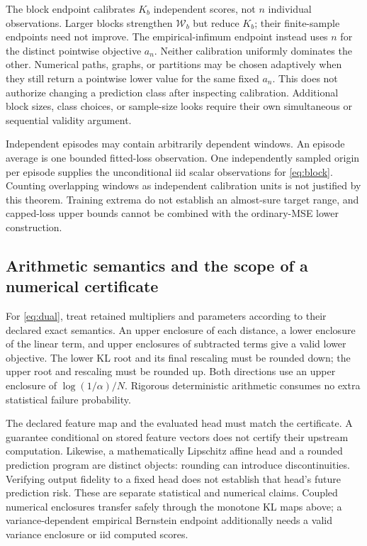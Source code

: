 The block endpoint calibrates $K_b$ independent scores, not $n$ individual
observations. Larger blocks strengthen $\mathcal W_b$ but reduce $K_b$;
their finite-sample endpoints need not improve. The empirical-infimum
endpoint instead uses $n$ for the distinct pointwise objective $a_n$.
Neither calibration uniformly dominates the other. Numerical paths,
graphs, or partitions may be chosen adaptively when they still return a
pointwise lower value for the same fixed $a_n$. This does not authorize
changing a prediction class after inspecting calibration. Additional block
sizes, class choices, or sample-size looks require their own simultaneous
or sequential validity argument.

Independent episodes may contain arbitrarily dependent windows. An episode
average is one bounded fitted-loss observation. One independently sampled
origin per episode supplies the unconditional iid scalar observations for
\eqref{eq:block}. Counting overlapping windows as independent calibration
units is not justified by this theorem. Training extrema do not establish
an almost-sure target range, and capped-loss upper bounds cannot be combined
with the ordinary-MSE lower construction.

\subsection{Arithmetic semantics and the scope of a numerical certificate}

For \eqref{eq:dual}, treat retained multipliers and parameters according
to their declared exact semantics. An upper enclosure of each distance,
a lower enclosure of the linear term, and upper enclosures of subtracted
terms give a valid lower objective. The lower KL root and its final
rescaling must be rounded down; the upper root and rescaling must be
rounded up. Both directions use an upper enclosure of
$\log(1/\alpha)/N$. Rigorous deterministic arithmetic consumes no extra
statistical failure probability.

The declared feature map and the evaluated head must match the certificate.
A guarantee conditional on stored feature vectors does not certify their
upstream computation. Likewise, a mathematically Lipschitz affine head
and a rounded prediction program are distinct objects: rounding can
introduce discontinuities. Verifying output fidelity to a fixed head does
not establish that head's future prediction risk. These are separate
statistical and numerical claims. Coupled numerical enclosures transfer
safely through the monotone KL maps above; a variance-dependent empirical
Bernstein endpoint additionally needs a valid variance enclosure or iid
computed scores.

